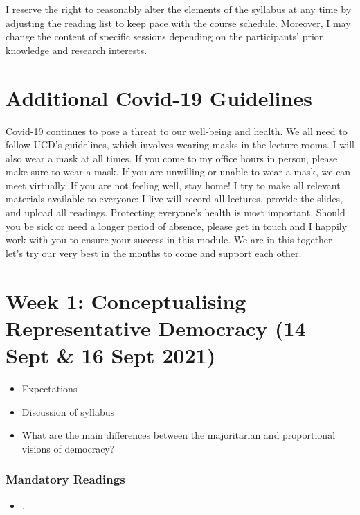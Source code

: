 \documentclass[abstract=on,parskip=full,headings=standardclasses,fontsize=11pt,paper=a4]{scrartcl}
\begin{document}
I reserve the right to reasonably alter the elements of the syllabus at any time by adjusting the reading list to keep pace with the course schedule. Moreover, I may change the content of specific sessions depending on the participants' prior knowledge and research interests.


\section*{Additional Covid-19 Guidelines}

Covid-19 continues to pose a threat to our well-being and health. We all need to follow UCD's guidelines, which involves wearing masks in the lecture rooms. I will also wear  a mask at all times. If you come to my office hours in person, please make sure to wear a mask. If you are unwilling or unable to wear a mask, we can meet virtually. If you are not feeling well, stay home! I try to make all relevant materials available to everyone: I live-will record all lectures, provide the slides, and upload all readings. Protecting everyone's health is most important. Should you be sick or need a longer period of absence, please get in touch  and I happily work with you to ensure your success in this module. We are in this together -- let's try our very best in the months to come and support each other.



\tableofcontents

\section{Week 1: Conceptualising Representative Democracy (14 Sept \& 16 Sept 2021)}

\begin{itemize}
\renewcommand\labelitemi{--}
\item Expectations
\item Discussion of syllabus
\item What are the main differences between the majoritarian and proportional visions of democracy?
\end{itemize}




\subsubsection*{Mandatory Readings}
\begin{itemize}
\item {}.

\end{itemize}
\end{document}
